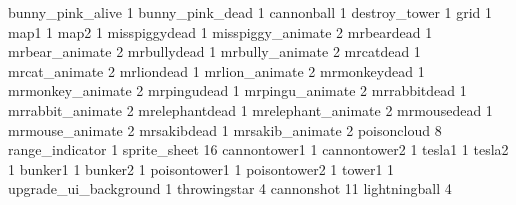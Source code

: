 bunny_pink_alive 1
bunny_pink_dead 1
cannonball 1
destroy_tower 1
grid 1
map1 1
map2 1
misspiggydead 1
misspiggy_animate 2
mrbeardead 1
mrbear_animate 2
mrbullydead 1
mrbully_animate 2
mrcatdead 1
mrcat_animate 2
mrliondead 1
mrlion_animate 2
mrmonkeydead 1
mrmonkey_animate 2
mrpingudead 1
mrpingu_animate 2
mrrabbitdead 1
mrrabbit_animate 2
mrelephantdead 1
mrelephant_animate 2
mrmousedead 1
mrmouse_animate 2
mrsakibdead 1
mrsakib_animate 2
poisoncloud 8
range_indicator 1
sprite_sheet 16
cannontower1 1
cannontower2 1
tesla1 1
tesla2 1
bunker1 1
bunker2 1
poisontower1 1
poisontower2 1
tower1 1
upgrade_ui_background 1
throwingstar 4
cannonshot 11
lightningball 4
